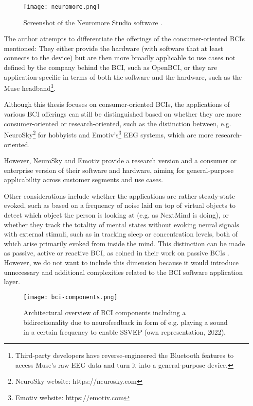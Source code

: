 \begin{figure}[ht]
  \centering
  \texttt{[image: neuromore.png]}
  \caption{Screenshot of the Neuromore Studio software \citep{neuromore_neuromore_nodate}.}
  \label{fig:neuromore}
\end{figure}

The author attempts to differentiate the offerings of the consumer-oriented BCIs mentioned: They either provide the hardware (with software that at least connects to the device) but are then more broadly applicable to use cases not defined by the company behind the BCI, such as OpenBCI, or they are application-specific in terms of both the software and the hardware, such as the Muse headband\footnote{Third-party developers have reverse-engineered the Bluetooth features to access Muse's raw EEG data and turn it into a general-purpose device.}.

Although this thesis focuses on consumer-oriented BCIs, the applications of various BCI offerings can still be distinguished based on whether they are more consumer-oriented or research-oriented, such as the distinction between, e.g. NeuroSky\footnote{NeuroSky website: https://neurosky.com} for hobbyists and Emotiv's\footnote{Emotiv website: https://emotiv.com} EEG systems, which are more research-oriented.

However, NeuroSky and Emotiv provide a research version and a consumer or enterprise version of their software and hardware, aiming for general-purpose applicability across customer segments and use cases.

Other considerations include whether the applications are rather steady-state evoked, such as based on a frequency of noise laid on top of virtual objects to detect which object the person is looking at (e.g. as NextMind is doing), or whether they track the totality of mental states without evoking neural signals with external stimuli, such as in tracking sleep or concentration levels, both of which arise primarily evoked from inside the mind. This distinction can be made as passive, active or reactive BCI, as \citeauthor{alimardani_passive_2020} coined in their work on passive BCIs \citep{alimardani_passive_2020}. However, we do not want to include this dimension because it would introduce unnecessary and additional complexities related to the BCI software application layer.

\begin{figure}[!ht]
  \centering
  \texttt{[image: bci-components.png]}
  \caption{Architectural overview of BCI components including a bidirectionality due to neurofeedback in form of e.g. playing a sound in a certain frequency to enable SSVEP (own representation, 2022).}
  \label{fig:bci-components}
\end{figure}

